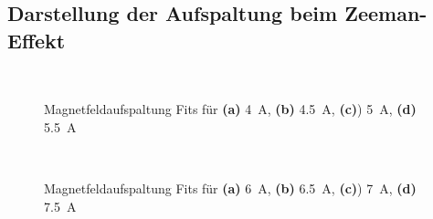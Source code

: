 \documentclass[11pt, a4paper]{article}
\begin{document}
\begin{appendix}
\section{Darstellung der Aufspaltung beim Zeeman-Effekt}
\label{app:penis}

\begin{figure}
\begin{subfigure}[c]{0.5\textwidth}
\scalebox{0.75}{
	
	}
	\subcaption{}
\end{subfigure}
\begin{subfigure}[c]{0.5\textwidth}
\scalebox{0.75}{
	
	}
	\subcaption{}
\end{subfigure}
\\
\begin{subfigure}[c]{0.5\textwidth}
	\scalebox{0.75}{
	
	}
	\subcaption{}
\end{subfigure}
\begin{subfigure}[c]{0.5\textwidth}
\scalebox{0.75}{
	
	}
	\subcaption{}
\end{subfigure}
\caption{Magnetfeldaufspaltung Fits für \textbf{(a)} \SI{4}{\ampere}, \textbf{(b)} \SI{4.5}{\ampere}, \textbf{(c)}) \SI{5}{\ampere}, \textbf{(d)} \SI{5.5}{\ampere}}
\end{figure}

\begin{figure}
\begin{subfigure}[c]{0.5\textwidth}
\scalebox{0.75}{
	
	}
	\subcaption{}
\end{subfigure}
\begin{subfigure}[c]{0.5\textwidth}
\scalebox{0.75}{
	
	}
	\subcaption{}
\end{subfigure}
\\
\begin{subfigure}[c]{0.5\textwidth}
	\scalebox{0.75}{
	
	}
	\subcaption{}
\end{subfigure}
\begin{subfigure}[c]{0.5\textwidth}
\scalebox{0.75}{
	
	}
	\subcaption{}
\end{subfigure}
\caption{Magnetfeldaufspaltung Fits für \textbf{(a)} \SI{6}{\ampere}, \textbf{(b)} \SI{6.5}{\ampere}, \textbf{(c)}) \SI{7}{\ampere}, \textbf{(d)} \SI{7.5}{\ampere}}
\end{figure}


\end{appendix}
\end{document}
